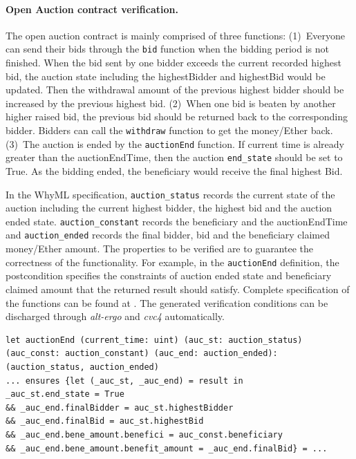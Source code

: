 \documentclass[runningheads]{llncs}
\begin{document}
\paragraph{Open Auction contract verification.}
The open auction contract is mainly comprised of three functions:
(1)~Everyone can send their bids through the \texttt{bid} function when the bidding period is not finished.
When the bid sent by one bidder exceeds the current recorded highest bid, the auction state including the highestBidder and highestBid would be updated. Then the withdrawal amount of the previous
highest bidder should be increased by the previous highest bid.
(2)~When one bid is beaten by another higher raised bid, the previous bid should be returned back to the
corresponding bidder. Bidders can call the \texttt{withdraw} function to get the money/Ether back.
(3)~The auction is ended by the \texttt{auctionEnd} function. If current time is already greater than the auctionEndTime,
then the auction \texttt{end\_state} should be set to True. As the bidding ended, the beneficiary would 
receive the final highest Bid.

In the WhyML specification, \texttt{auction\_status} records the current state of the auction including the current 
highest bidder, the highest bid and the auction ended state. \texttt{auction\_constant} records the beneficiary and the
auctionEndTime and \texttt{auction\_ended} records the final bidder, bid and the beneficiary claimed money/Ether amount.
The properties to be verified are to guarantee the correctness of the functionality. For example,
in the \texttt{auctionEnd} definition, the postcondition specifies the constraints of 
auction ended state and beneficiary claimed amount that the returned result should satisfy.
Complete specification of the functions can be found at \cite{Examples}.
The generated verification conditions can be discharged through \emph{alt-ergo} and \emph{cvc4} automatically.

\begin{verbatim}
let auctionEnd (current_time: uint) (auc_st: auction_status) 
(auc_const: auction_constant) (auc_end: auction_ended): 
(auction_status, auction_ended) 
... ensures {let (_auc_st, _auc_end) = result in 
_auc_st.end_state = True 
&& _auc_end.finalBidder = auc_st.highestBidder 
&& _auc_end.finalBid = auc_st.highestBid
&& _auc_end.bene_amount.benefici = auc_const.beneficiary 
&& _auc_end.bene_amount.benefit_amount = _auc_end.finalBid} = ...
\end{verbatim}
\end{document}
